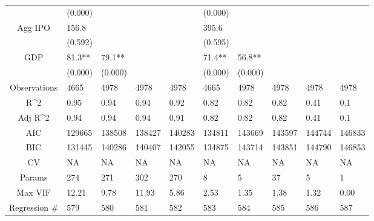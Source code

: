 \documentclass{article}
\begin{document}
\begin{table}[H]
\begin{tabular}{|clllllllll|}
   & (0.000) &  &  &  & (0.000) &  &  &  &  \\ 
  Agg IPO & 156.8 &  &  &  & 395.6 &  &  &  &  \\ 
   & (0.592) &  &  &  & (0.595) &  &  &  &  \\ 
  GDP & 81.3** & 79.1** &  &  & 71.4** & 56.8** &  &  &  \\ 
   & (0.000) & (0.000) &  &  & (0.000) & (0.000) &  &  &  \\ 
  \hline 
 Observations & 4665 & 4978 & 4978 & 4978 & 4665 & 4978 & 4978 & 4978 & 4978 \\ 
  R^2 & 0.95 & 0.94 & 0.94 & 0.92 & 0.82 & 0.82 & 0.82 & 0.41 & 0.1 \\ 
  Adj R^2 & 0.94 & 0.94 & 0.94 & 0.91 & 0.82 & 0.82 & 0.82 & 0.41 & 0.1 \\ 
  AIC & 129665 & 138508 & 138427 & 140283 & 134811 & 143669 & 143597 & 144744 & 146833 \\ 
  BIC & 131445 & 140286 & 140407 & 142055 & 134875 & 143714 & 143851 & 144790 & 146853 \\ 
  CV & NA & NA & NA & NA & NA & NA & NA & NA & NA \\ 
  Params & 274 & 271 & 302 & 270 & 8 & 5 & 37 & 5 & 1 \\ 
  Max VIF & 12.21 & 9.78 & 11.93 & 5.86 & 2.53 & 1.35 & 1.38 & 1.32 & 0.00 \\ 
  Regression \# & 579 & 580 & 581 & 582 & 583 & 584 & 585 & 586 & 587 \\ 
   \hline
\end{tabular}
 
\end{table}
\end{document}
